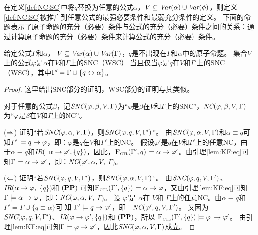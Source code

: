 在定义\ref{def:NC:SC}中将$q$替换为任意的公式$\alpha$，$V\subseteq \textit{Var}(\alpha) \cup \textit{Var}(\phi)$，则定义\ref{def:NC:SC}被推广到任意公式的最强必要条件和最弱充分条件的定义。
下面的命题表示了原子命题的充分（必要）条件与公式的充分（必要）条件之间的关系：通过计算原子命题的充分（必要）条件来计算公式的充分（必要）条件。



\begin{proposition}\label{formulaNS_to_p}
	给定公式$\Gamma$和$\alpha$， $V \subseteq \textit{Var}(\alpha) \cup \textit{Var}(\Gamma)$，$q$是不出现在$\Gamma$和$\alpha$中的原子命题。
	集合$V$上的公式$\varphi$是$\alpha$在$V$和$\Gamma$上的SNC（WSC） 当且仅当$\varphi$是$q$在$V$和$\Gamma'$上的SNC（WSC），其中$\Gamma' = \Gamma \cup \{q \leftrightarrow \alpha\}$。
\end{proposition}
\begin{proof}
	这里给出SNC部分的证明，WSC部分的证明与其类似。
	
	对于任意的公式$\beta$，记$\emph{SNC}(\varphi,\beta,V,\Gamma)$为“$\varphi$是$\beta$在$V$和$\Gamma$上的SNC”，$\emph{NC}(\varphi,\beta,V,\Gamma)$为“$\varphi$是$\beta$在$V$和$\Gamma$上的NC”。
	
	
	($\Rightarrow$) 证明“若$\emph{SNC}(\varphi,\alpha,V,\Gamma)$，则$\emph{SNC}(\varphi,q,V,\Gamma')$”。
	由$\emph{SNC}(\varphi,\alpha,V,\Gamma)$和$\alpha\equiv q$可知$\Gamma'$ $\models q\rightarrow \varphi$，即：$\varphi$是$q$在$V$和$\Gamma'$上的NC。
	假设$\varphi'$是$q$在$V$和$\Gamma'$上的任意NC，由于$\alpha\equiv q$和$\emph{IR}($ $\alpha \rightarrow \varphi', \{q\})$，因此，${\textsc{F}_{\textsc{ctl}}}(\Gamma',q)\models \alpha \rightarrow \varphi'$。由引理\ref{lem:KF:eq}可知$\Gamma \models \alpha \rightarrow \varphi'$，即：$\emph{NC}(\varphi',\alpha,V,$ $\Gamma)$。
	
	
	($\Leftarrow$) 证明“若$\emph{SNC}(\varphi,q,V,\Gamma')$，则$\emph{SNC}(\varphi,\alpha,V,\Gamma)$”。
	由$\emph{SNC}(\varphi,q,V,\Gamma')$、$\emph{IR}(\alpha \rightarrow \varphi,$ $\{q\})$和 $(\textbf{PP})$ 可知${\textsc{F}_{\textsc{ctl}}}(\Gamma', \{q\})\models \alpha \rightarrow \varphi$，又由引理\ref{lem:KF:eq}可知$\Gamma \models \alpha \rightarrow \varphi$，即：$\emph{NC}(\varphi,\alpha,V,$ $\Gamma)$。
	设 $\varphi'$是 $\alpha$在 $V$和 $\Gamma$上的任意NC。由$\alpha\equiv q$和 $\Gamma'=\Gamma \cup \{q\equiv \alpha\}$可 知 $\Gamma' \models q \rightarrow \varphi'$，即：$\emph{NC}(\varphi',q,V,\Gamma')$。
	又因为$\emph{SNC}(\varphi,q,V,\Gamma')$、$\emph{IR}(\varphi \rightarrow \varphi', \{q\})$和 $(\textbf{PP})$，所以 ${\textsc{F}_{\textsc{ctl}}}(\Gamma', \{q\})\models \varphi$  $\rightarrow \varphi'$。
	由引理\ref{lem:KF:eq}可知$\Gamma \models \varphi \rightarrow \varphi'$，因此$\emph{SNC}(\varphi,\alpha,V, \Gamma)$成立。
\end{proof}

